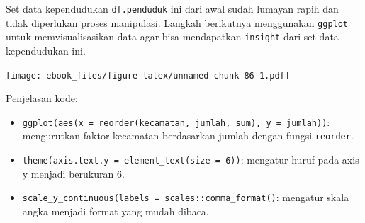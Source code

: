 \documentclass[openany]{book}
\newenvironment{Shaded}{\begin{snugshade}}{\end{snugshade}}
\newcommand{\KeywordTok}[1]{\textcolor[rgb]{0.13,0.29,0.53}{\textbf{#1}}}
\newcommand{\DataTypeTok}[1]{\textcolor[rgb]{0.13,0.29,0.53}{#1}}
\newcommand{\DecValTok}[1]{\textcolor[rgb]{0.00,0.00,0.81}{#1}}
\newcommand{\StringTok}[1]{\textcolor[rgb]{0.31,0.60,0.02}{#1}}
\newcommand{\CommentTok}[1]{\textcolor[rgb]{0.56,0.35,0.01}{\textit{#1}}}
\newcommand{\OperatorTok}[1]{\textcolor[rgb]{0.81,0.36,0.00}{\textbf{#1}}}
\newcommand{\NormalTok}[1]{#1}
\begin{document}
Set data kependudukan \texttt{df.penduduk} ini dari awal sudah lumayan
rapih dan tidak diperlukan proses manipulasi. Langkah berikutnya
menggunakan \texttt{ggplot} untuk memvisualisasikan data agar bisa
mendapatkan \texttt{insight} dari set data kependudukan ini.

\begin{Shaded}
\end{Shaded}

\texttt{[image: ebook\_files/figure-latex/unnamed-chunk-86-1.pdf]}

Penjelasan kode:

\begin{itemize}
\item
  \texttt{ggplot(aes(x\ =\ reorder(kecamatan,\ jumlah,\ sum),\ y\ =\ jumlah))}:
  mengurutkan faktor kecamatan berdasarkan jumlah dengan fungsi
  \texttt{reorder}.
\item
  \texttt{theme(axis.text.y\ =\ element\_text(size\ =\ 6))}: mengatur
  huruf pada axis y menjadi berukuran 6.
\item
  \texttt{scale\_y\_continuous(labels\ =\ scales::comma\_format()}:
  mengatur skala angka menjadi format yang mudah dibaca.
\end{itemize}
\end{document}
